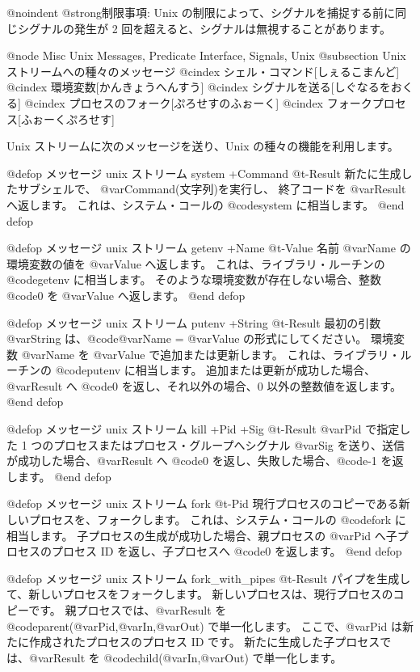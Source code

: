 {{{{@noindent
@strong{制限事項}:
Unix の制限によって、シグナルを捕捉する前に同じシグナルの発生が 2 回を超えると、シグナルは無視することがあります。

@node Misc Unix Messages, Predicate Interface, Signals, Unix
@subsection Unix ストリームへの種々のメッセージ
@cindex シェル・コマンド[しぇるこまんど]
@cindex 環境変数[かんきょうへんすう]
@cindex シグナルを送る[しぐなるをおくる]
@cindex プロセスのフォーク[ぷろせすのふぉーく]
@cindex フォークプロセス[ふぉーくぷろせす]

Unix ストリームに次のメッセージを送り、Unix の種々の機能を利用します。

@defop {メッセージ} {unix ストリーム}  system +Command @t{-}Result
新たに生成したサブシェルで、 @var{Command}(文字列)を実行し、
終了コードを @var{Result} へ返します。
これは、システム・コールの @code{system} に相当します。
@end defop

@defop {メッセージ} {unix ストリーム}  getenv +Name @t{-}Value
名前 @var{Name} の環境変数の値を @var{Value} へ返します。
これは、ライブラリ・ルーチンの @code{getenv} に相当します。
そのような環境変数が存在しない場合、整数 @code{0} を @var{Value} へ返します。
@end defop  

@defop {メッセージ} {unix ストリーム}  putenv +String @t{-}Result
最初の引数 @var{String} は、@code{@var{Name} = @var{Value}} の形式にしてください。
環境変数 @var{Name} を @var{Value} で追加または更新します。
これは、ライブラリ・ルーチンの @code{putenv} に相当します。
追加または更新が成功した場合、@var{Result} へ @code{0} を返し、それ以外の場合、0 以外の整数値を返します。
@end defop  

@defop {メッセージ} {unix ストリーム}  kill +Pid +Sig @t{-}Result
@var{Pid} で指定した 1 つのプロセスまたはプロセス・グループへシグナル @var{Sig} を送り、送信が成功した場合、@var{Result} へ @code{0} を返し、失敗した場合、@code{-1} を返します。
@end defop  

@defop {メッセージ} {unix ストリーム}  fork @t{-}Pid
現行プロセスのコピーである新しいプロセスを、フォークします。
これは、システム・コールの @code{fork} に相当します。
子プロセスの生成が成功した場合、親プロセスの @var{Pid} へ子プロセスのプロセス ID を返し、子プロセスへ @code{0} を返します。
@end defop  

@defop {メッセージ} {unix ストリーム}  fork_with_pipes @t{-}Result
パイプを生成して、新しいプロセスをフォークします。
新しいプロセスは、現行プロセスのコピーです。
親プロセスでは、@var{Result} を @code{parent(@var{Pid},@var{In},@var{Out})} で単一化します。
ここで、@var{Pid} は新たに作成されたプロセスのプロセス ID です。
新たに生成した子プロセスでは、@var{Result} を @code{child(@var{In},@var{Out})} で単一化します。

}}}}
